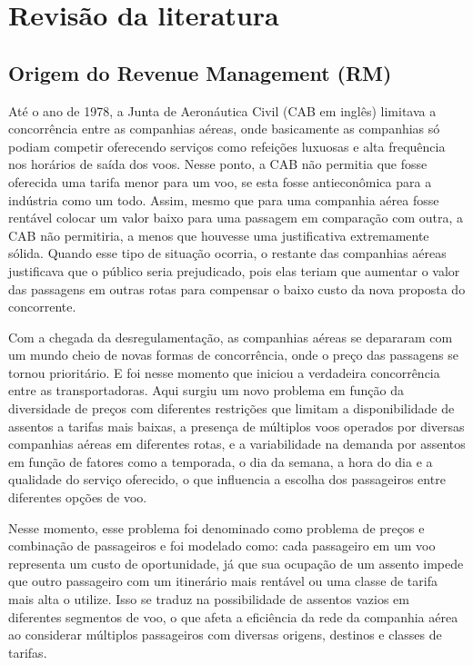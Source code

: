 \chapter{Revisão da literatura}

\section{Origem do Revenue Management (RM)}

Até o ano de 1978, a Junta de Aeronáutica Civil (CAB em inglês) limitava a concorrência entre as companhias aéreas, onde basicamente as companhias só podiam competir oferecendo serviços como refeições luxuosas e alta frequência nos horários de saída dos voos. Nesse ponto, a CAB não permitia que fosse oferecida uma tarifa menor para um voo, se esta fosse antieconômica para a indústria como um todo. Assim, mesmo que para uma companhia aérea fosse rentável colocar um valor baixo para uma passagem em comparação com outra, a CAB não permitiria, a menos que houvesse uma justificativa extremamente sólida. Quando esse tipo de situação ocorria, o restante das companhias aéreas justificava que o público seria prejudicado, pois elas teriam que aumentar o valor das passagens em outras rotas para compensar o baixo custo da nova proposta do concorrente.

Com a chegada da desregulamentação, as companhias aéreas se depararam com um mundo cheio de novas formas de concorrência, onde o preço das passagens se tornou prioritário. E foi nesse momento que iniciou a verdadeira concorrência entre as transportadoras. Aqui surgiu um novo problema em função da diversidade de preços com diferentes restrições que limitam a disponibilidade de assentos a tarifas mais baixas, a presença de múltiplos voos operados por diversas companhias aéreas em diferentes rotas, e a variabilidade na demanda por assentos em função de fatores como a temporada, o dia da semana, a hora do dia e a qualidade do serviço oferecido, o que influencia a escolha dos passageiros entre diferentes opções de voo.

Nesse momento, esse problema foi denominado como problema de preços e combinação de passageiros e foi modelado como: cada passageiro em um voo representa um custo de oportunidade, já que sua ocupação de um assento impede que outro passageiro com um itinerário mais rentável ou uma classe de tarifa mais alta o utilize. Isso se traduz na possibilidade de assentos vazios em diferentes segmentos de voo, o que afeta a eficiência da rede da companhia aérea ao considerar múltiplos passageiros com diversas origens, destinos e classes de tarifas.

